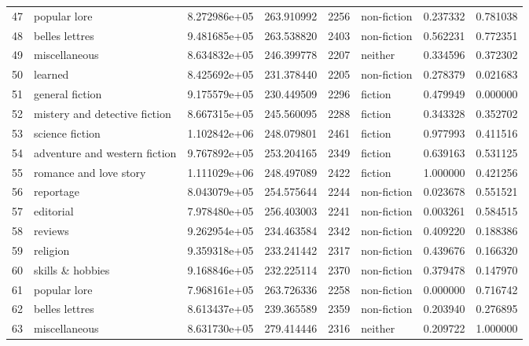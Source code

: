 \documentclass[11pt]{article}
\begin{document}
\begin{longtable}{llrrrlrr}
47 &                   popular lore &  8.272986e+05 &  263.910992 &  2256 &   non-fiction &    0.237332 &     0.781038 \\
48 &                 belles lettres &  9.481685e+05 &  263.538820 &  2403 &   non-fiction &    0.562231 &     0.772351 \\
49 &                  miscellaneous &  8.634832e+05 &  246.399778 &  2207 &       neither &    0.334596 &     0.372302 \\
50 &                        learned &  8.425692e+05 &  231.378440 &  2205 &   non-fiction &    0.278379 &     0.021683 \\
51 &                general fiction &  9.175579e+05 &  230.449509 &  2296 &       fiction &    0.479949 &     0.000000 \\
52 &  mistery and detective fiction &  8.667315e+05 &  245.560095 &  2288 &       fiction &    0.343328 &     0.352702 \\
53 &                science fiction &  1.102842e+06 &  248.079801 &  2461 &       fiction &    0.977993 &     0.411516 \\
54 &  adventure and western fiction &  9.767892e+05 &  253.204165 &  2349 &       fiction &    0.639163 &     0.531125 \\
55 &         romance and love story &  1.111029e+06 &  248.497089 &  2422 &       fiction &    1.000000 &     0.421256 \\
56 &                      reportage &  8.043079e+05 &  254.575644 &  2244 &   non-fiction &    0.023678 &     0.551521 \\
57 &                      editorial &  7.978480e+05 &  256.403003 &  2241 &   non-fiction &    0.003261 &     0.584515 \\
58 &                        reviews &  9.262954e+05 &  234.463584 &  2342 &   non-fiction &    0.409220 &     0.188386 \\
59 &                       religion &  9.359318e+05 &  233.241442 &  2317 &   non-fiction &    0.439676 &     0.166320 \\
60 &               skills \& hobbies &  9.168846e+05 &  232.225114 &  2370 &   non-fiction &    0.379478 &     0.147970 \\
61 &                   popular lore &  7.968161e+05 &  263.726336 &  2258 &   non-fiction &    0.000000 &     0.716742 \\
62 &                 belles lettres &  8.613437e+05 &  239.365589 &  2359 &   non-fiction &    0.203940 &     0.276895 \\
63 &                  miscellaneous &  8.631730e+05 &  279.414446 &  2316 &       neither &    0.209722 &     1.000000 \\

\end{longtable}
\end{document}
